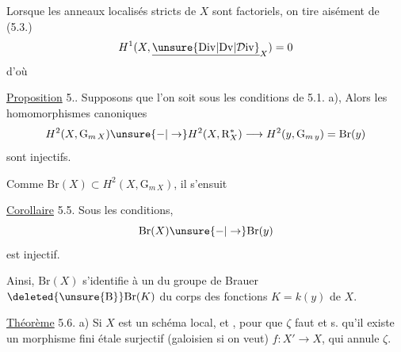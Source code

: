 Lorsque  les anneaux localisés stricts de $X$ sont factoriels, on tire aisément de (5.3.)
\[
H^1(X,\underline{\unsure{\mathrm{Div}|\mathrm{Dv}|\mathcal{D}\mathrm{iv}}}_X)=0
\]
d'où 

\uline{Proposition} 5.. Supposons que l'on soit sous les conditions de 5.1. a),  Alors les homomorphismes canoniques
\[
H^2(X,\mathrm{G}_{m\,X})\unsure{-|\to}H^2(X,\mathrm{R}_X^*)\longrightarrow H^2(y,\mathrm{G}_{m\,y})=\mathrm{Br}(y)
\]
sont injectifs.

Comme $\mathrm{Br}(X)\subset H^2(X,\mathrm{G}_{m\,X})$, il s'ensuit

\uline{Corollaire} 5.5. Sous les  conditions,
\[
\mathrm{Br}(X)\unsure{-|\to}\mathrm{Br}(y)
\]
est injectif.

Ainsi, $\mathrm{Br}(X)$ s'identifie  à un  du groupe de Brauer $\deleted{\unsure{\mathrm{B}}}\mathrm{Br}(K)$ du corps des fonctions $K=k(y)$ de $X$.

\uline{Théorème} 5.6.  a) Si $X$ est un schéma local, et , pour que $\zeta$   faut et s. qu'il existe un  morphisme fini étale surjectif (galoisien si on veut) $f\colon X'\to X$,  qui  annule $\zeta$.

